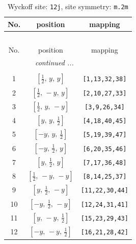 \documentclass[fleqn,8pt]{jsarticle}
\begin{document}
\begin{longtable}{ccc}
\caption{Wyckoff site: {\tt 12j}, site symmetry: {\tt m.2m}}
 \\
 \hline \hline
No. & position & mapping \\ \hline \endfirsthead

\multicolumn{2}{l}{\tablename\ \thetable{}} \\
 \hline \hline
No. & position & mapping \\ \hline \endhead

 \hline \hline
\multicolumn{2}{r}{\footnotesize\it continued ...} \\ \endfoot

 \hline \hline
\multicolumn{2}{r}{} \\ \endlastfoot

1 & $\left[ \frac{1}{2},\, y,\, y \right]$ & {\tt [1,13,32,38]} \\ \hline
2 & $\left[ \frac{1}{2},\, - y,\, y \right]$ & {\tt [2,10,27,33]} \\ \hline
3 & $\left[ \frac{1}{2},\, y,\, - y \right]$ & {\tt [3,9,26,34]} \\ \hline
4 & $\left[ y,\, y,\, \frac{1}{2} \right]$ & {\tt [4,18,40,45]} \\ \hline
5 & $\left[ - y,\, y,\, \frac{1}{2} \right]$ & {\tt [5,19,39,47]} \\ \hline
6 & $\left[ - y,\, \frac{1}{2},\, y \right]$ & {\tt [6,20,35,46]} \\ \hline
7 & $\left[ y,\, \frac{1}{2},\, y \right]$ & {\tt [7,17,36,48]} \\ \hline
8 & $\left[ \frac{1}{2},\, - y,\, - y \right]$ & {\tt [8,14,25,37]} \\ \hline
9 & $\left[ y,\, \frac{1}{2},\, - y \right]$ & {\tt [11,22,30,44]} \\ \hline
10 & $\left[ - y,\, \frac{1}{2},\, - y \right]$ & {\tt [12,24,31,41]} \\ \hline
11 & $\left[ y,\, - y,\, \frac{1}{2} \right]$ & {\tt [15,23,29,43]} \\ \hline
12 & $\left[ - y,\, - y,\, \frac{1}{2} \right]$ & {\tt [16,21,28,42]} \\
\end{longtable}
\renewcommand{\arraystretch}{1.2}
\end{document}
